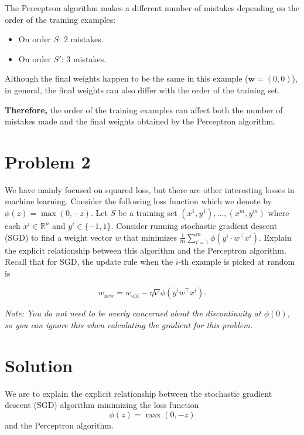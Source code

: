 \documentclass{article}
\begin{document}
The Perceptron algorithm makes a different number of mistakes depending on the order of the training examples:

\begin{itemize}
    \item On order \( S \): 2 mistakes.
    \item On order \( S' \): 3 mistakes.
\end{itemize}

Although the final weights happen to be the same in this example (\( \mathbf{w} = (0, 0) \)), in general, the final weights can also differ with the order of the training set.

\bigskip

\textbf{Therefore,} the order of the training examples can affect both the number of mistakes made and the final weights obtained by the Perceptron algorithm.

\bigskip

\section*{Problem 2}

\textbf{} We have mainly focused on squared loss, but there are other interesting losses in machine learning. Consider the following loss function which we denote by \( \phi(z) = \max(0, -z) \). Let \( S \) be a training set \( (x^1, y^1), \ldots, (x^m, y^m) \) where each \( x^i \in \mathbb{R}^n \) and \( y^i \in \{-1, 1\} \). Consider running stochastic gradient descent (SGD) to find a weight vector \( w \) that minimizes \( \frac{1}{m} \sum_{i=1}^m \phi(y^i \cdot w^\top x^i) \). Explain the explicit relationship between this algorithm and the Perceptron algorithm. Recall that for SGD, the update rule when the \( i \)-th example is picked at random is

\[
w_{\text{new}} = w_{\text{old}} - \eta \nabla \phi \left( y^i w^\top x^i \right).
\]

\textit{Note: You do not need to be overly concerned about the discontinuity at \( \phi(0) \), so you can ignore this when calculating the gradient for this problem.}

\section*{Solution}

We are to explain the explicit relationship between the stochastic gradient descent (SGD) algorithm minimizing the loss function
\[
\phi(z) = \max(0, -z)
\]
and the Perceptron algorithm.
\end{document}
